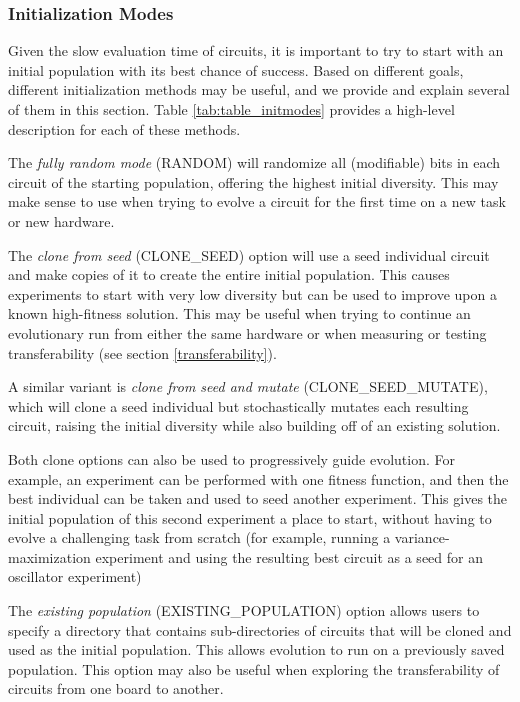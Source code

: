 \documentclass{ieeeaccess}
\newcommand{\highlight}[1]{#1}
\begin{document}
\subsubsection{Initialization Modes}
Given the slow evaluation time of circuits, it is important to try to start with an initial population with its best chance of success. Based on different goals, different initialization methods may be useful, and we provide and explain several of them in this section. Table \ref{tab:table_initmodes} provides a high-level description for each of these methods.

The \textit{fully random mode} (RANDOM) will randomize all (modifiable) bits in each circuit of the starting population, offering the highest initial diversity. This may make sense to use when trying to evolve a circuit for the first time on a new task or new hardware.

The \textit{clone from seed} (CLONE\_SEED) option will use a seed individual circuit and make copies of it to create the entire initial population. This causes experiments to start with very low diversity but can be used to improve upon a known high-fitness solution. This may be useful when trying to continue an evolutionary run from either the same hardware or when measuring or testing transferability (see section \ref{transferability}).

A similar variant is \textit{clone from seed and mutate} (CLONE\_SEED\_MUTATE), which will clone a seed individual but stochastically mutates each resulting circuit, raising the initial diversity while also building off of an existing solution. 

Both clone options can also be used to progressively guide evolution. For example, an experiment can be performed with one fitness function, and then the best individual can be taken and used to seed another experiment. This gives the initial population of this second experiment a place to start, without having to evolve a challenging task from scratch \highlight{(for example, running a variance-maximization experiment} \highlight{and using the resulting best circuit as a seed for an oscillator} \highlight{experiment)}

The \textit{existing population} (EXISTING\_POPULATION) option allows users to specify a directory that contains sub-directories of circuits that will be cloned and used as the initial population. This allows evolution to run on a previously saved population. This option may also be useful when exploring the transferability of circuits from one board to another.
\end{document}

